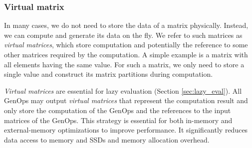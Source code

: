 \subsubsection{Virtual matrix} \label{virt_mat}
In many cases, we do not need to store the data of a matrix physically. Instead,
we can compute and generate its data on the fly. We refer to such matrices as
\textit{virtual matrices}, which store computation and potentially the reference
to some other matrices required by the computation. A simple example is a matrix
with all elements having the same value. For such a matrix, we only need to store
a single value and construct its matrix partitions during computation.

\textit{Virtual matrices} are essential for lazy evaluation (Section
\ref{sec:lazy_eval}). All GenOps may output \textit{virtual matrices} that
represent the computation result and only store the computation of the GenOps
and the references to the input matrices of the GenOps. This strategy is
essential for both in-memory and external-memory optimizations to improve
performance. It significantly reduces data access to memory and SSDs and
memory allocation overhead.




